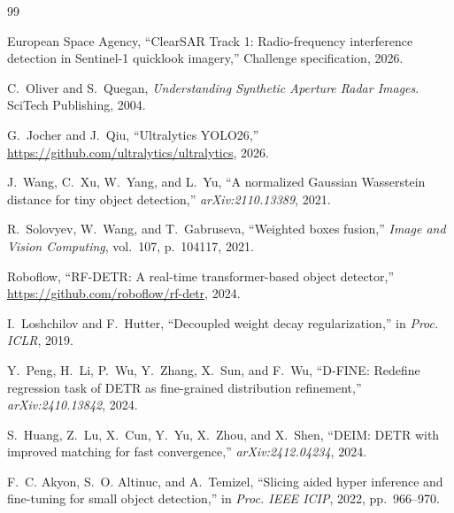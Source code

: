 \documentclass{article}
\begin{document}

\begin{thebibliography}{99}

European Space Agency,
``ClearSAR Track 1: Radio-frequency interference detection in
Sentinel-1 quicklook imagery,''
Challenge specification, 2026.

C.~Oliver and S.~Quegan,
\emph{Understanding Synthetic Aperture Radar Images}.
SciTech Publishing, 2004.

G.~Jocher and J.~Qiu,
``Ultralytics YOLO26,''
\url{https://github.com/ultralytics/ultralytics}, 2026.

J.~Wang, C.~Xu, W.~Yang, and L.~Yu,
``A normalized Gaussian Wasserstein distance for tiny object
detection,''
\emph{arXiv:2110.13389}, 2021.

R.~Solovyev, W.~Wang, and T.~Gabruseva,
``Weighted boxes fusion,''
\emph{Image and Vision Computing}, vol.~107, p.~104117, 2021.

Roboflow,
``RF-DETR: A real-time transformer-based object detector,''
\url{https://github.com/roboflow/rf-detr}, 2024.

I.~Loshchilov and F.~Hutter,
``Decoupled weight decay regularization,''
in \emph{Proc. ICLR}, 2019.

Y.~Peng, H.~Li, P.~Wu, Y.~Zhang, X.~Sun, and F.~Wu,
``D-FINE: Redefine regression task of DETR as fine-grained
distribution refinement,''
\emph{arXiv:2410.13842}, 2024.

S.~Huang, Z.~Lu, X.~Cun, Y.~Yu, X.~Zhou, and X.~Shen,
``DEIM: DETR with improved matching for fast convergence,''
\emph{arXiv:2412.04234}, 2024.

F.~C. Akyon, S.~O. Altinuc, and A.~Temizel,
``Slicing aided hyper inference and fine-tuning for small object
detection,''
in \emph{Proc. IEEE ICIP}, 2022, pp.~966--970.

\end{thebibliography}
\end{document}

